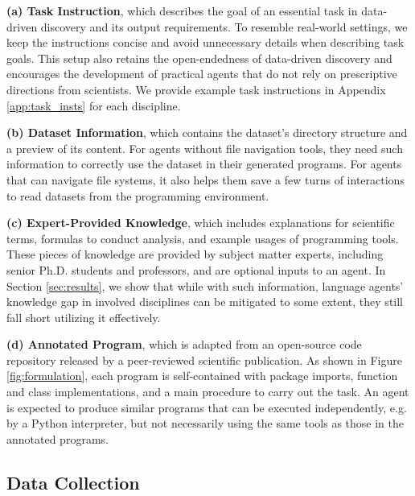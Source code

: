 \documentclass{article} %
\begin{document}
%
\textbf{(a) Task Instruction}, which describes the goal of an essential task in data-driven discovery and its output requirements.
To resemble real-world settings, we keep the instructions concise and avoid unnecessary details when describing task goals.
This setup also retains the open-endedness of data-driven discovery and encourages the development of practical agents that do not rely on prescriptive directions from scientists. 
We provide example task instructions in Appendix \ref{app:task_insts} for each discipline.
%

%
\textbf{(b) Dataset Information}, which contains the dataset's directory structure and a preview of its content.
For agents without file navigation tools, they need such information to correctly use the dataset in their generated programs.
For agents that can navigate file systems, it also helps them save a few turns of interactions to read datasets from the programming environment.
%

%
\textbf{(c) Expert-Provided Knowledge}, which includes explanations for scientific terms, formulas to conduct analysis, and example usages of programming tools.
These pieces of knowledge are provided by subject matter experts, including senior Ph.D. students and professors, and are optional inputs to an agent.
In Section \ref{sec:results}, we show that while with such information, language agents' knowledge gap in involved disciplines can be mitigated to some extent, they still fall short utilizing it effectively.
%

%
\textbf{(d) Annotated Program}, which is adapted from an open-source code repository released by a peer-reviewed scientific publication.
As shown in Figure \ref{fig:formulation}, each program is self-contained with package imports, function and class implementations, and a main procedure to carry out the task.
An agent is expected to produce similar programs that can be executed independently, e.g. by a Python interpreter, but not necessarily using the same tools as those in the annotated programs.
%

\subsection{Data Collection}
\label{sec:data_collection}
\end{document}
